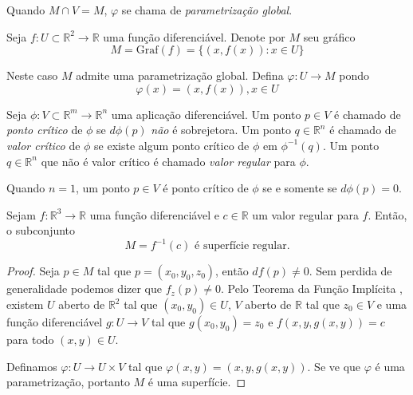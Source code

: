\begin{obse}
	Quando $M \cap V = M$, $\varphi$ se chama de \emph{parametrização global}.
\end{obse}

\begin{exemplo}
Seja $f: U \subset \mathbb{R}^2 \rightarrow \mathbb{R}$ uma função diferenciável. Denote por $M$ seu gráfico
\begin{equation*}
    M = \text{Graf}(f) = \{ (x,f(x)): x \in U \}
\end{equation*}

Neste caso $M$ admite uma parametrização global. Defina $\varphi: U \rightarrow M$ pondo
\begin{equation*}
    \varphi(x) = (x,f(x)), x \in U
\end{equation*}
\end{exemplo}

\begin{defi}
Seja $\phi: V \subset \mathbb{R}^m \rightarrow \mathbb{R}^n$ uma aplicação diferenciável. Um ponto $p \in V$ é chamado de \emph{ponto crítico} de $\phi$ se $d\phi(p)$ \emph{não} é sobrejetora. Um ponto $q \in \mathbb{R}^n$ é chamado de \emph{valor crítico} de $\phi$ se existe algum ponto crítico de $\phi$ em $\phi^{-1}(q)$. Um ponto $q \in \mathbb{R}^n$ que não é valor crítico é chamado \emph{valor regular} para $\phi$.
\end{defi}

\begin{obse}
Quando $n=1$, um ponto $p \in V$ é ponto crítico de $\phi$ se e somente se $d\phi(p)=0$.
\end{obse}

\begin{teo}\label{preimagem_de_um_valor_regular}
Sejam $f: \mathbb{R}^3 \rightarrow \mathbb{R}$ uma função diferenciável e $c \in \mathbb{R}$ um valor regular para $f$. Então, o subconjunto
\begin{equation*}
    M = f^{-1}(c) \text{ é superfície regular.}
\end{equation*}
\end{teo}

\begin{proof}
Seja $p \in M$ tal que $p=(x_0,y_0,z_0)$, então $df(p) \neq 0$. Sem perdida de generalidade podemos dizer que $f_z(p) \neq 0$. Pelo Teorema da Função Implícita \cite[p.~296]{lima1985} \cite[p.~36]{montiel2009}, existem $U$ aberto de $\mathbb{R}^2$ tal que $(x_0,y_0) \in U$, $V$ aberto de $\mathbb{R}$ tal que $z_0 \in V$ e uma função diferenciável $g: U \rightarrow V$ tal que $g(x_0,y_0)=z_0$ e $f(x,y,g(x,y)) = c$ para todo $(x,y) \in U$.

Definamos $\varphi: U \rightarrow U \times V$ tal que $\varphi(x,y) = (x,y,g(x,y))$. Se ve que $\varphi$ é uma parametrização, portanto $M$ é uma superfície.
\end{proof}

